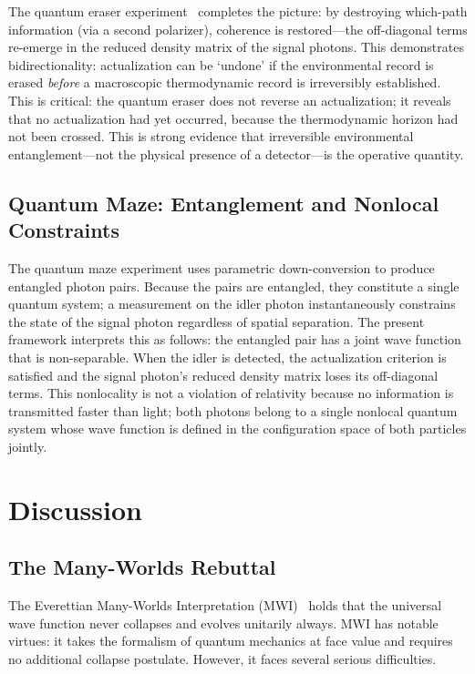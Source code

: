 \documentclass[11pt,a4paper]{article}
\theoremstyle{plain}
\theoremstyle{definition}
\theoremstyle{remark}
\begin{document}
The quantum eraser experiment~\citep{ScullyDruhl1982} completes the picture: by
destroying which-path information (via a second polarizer), coherence is
restored---the off-diagonal terms re-emerge in the reduced density matrix of the
signal photons. This demonstrates bidirectionality: actualization can be `undone'
if the environmental record is erased \emph{before} a macroscopic thermodynamic
record is irreversibly established. This is critical: the quantum eraser does not
reverse an actualization; it reveals that no actualization had yet occurred,
because the thermodynamic horizon had not been crossed. This is strong evidence
that irreversible environmental entanglement---not the physical presence of a
detector---is the operative quantity.

\subsection{Quantum Maze: Entanglement and Nonlocal Constraints}

The quantum maze experiment uses parametric down-conversion to produce entangled
photon pairs. Because the pairs are entangled, they constitute a single quantum
system; a measurement on the idler photon instantaneously constrains the state of
the signal photon regardless of spatial separation. The present framework
interprets this as follows: the entangled pair has a joint wave function that is
non-separable. When the idler is detected, the actualization criterion is satisfied
and the signal photon's reduced density matrix loses its off-diagonal terms. This
nonlocality is not a violation of relativity because no information is transmitted
faster than light; both photons belong to a single nonlocal quantum system whose
wave function is defined in the configuration space of both particles jointly.

\section{Discussion}
\label{sec:discussion}

\subsection{The Many-Worlds Rebuttal}

The Everettian Many-Worlds Interpretation
(MWI)~\citep{Everett1957,SaundersEtAl2010} holds that the universal wave function
never collapses and evolves unitarily always. MWI has notable virtues: it takes
the formalism of quantum mechanics at face value and requires no additional
collapse postulate. However, it faces several serious difficulties.
\end{document}
